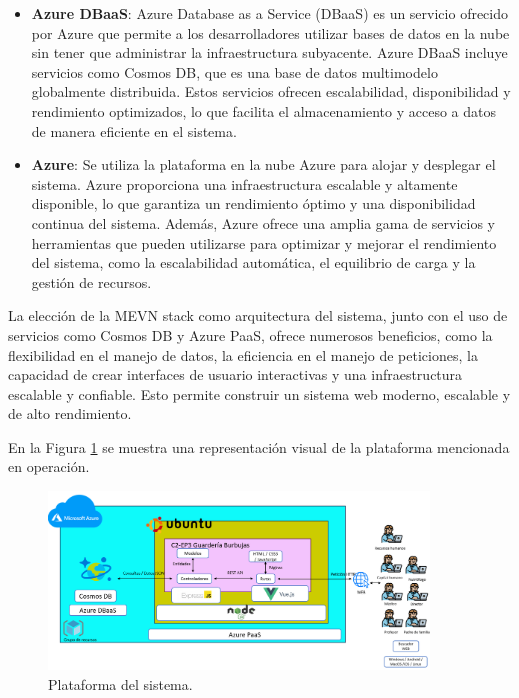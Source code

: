 \begin{itemize}
\item \textbf{Azure DBaaS}: Azure Database as a Service (DBaaS) es un servicio ofrecido por Azure que permite a los desarrolladores utilizar bases de datos en la nube sin tener que administrar la infraestructura subyacente. Azure DBaaS incluye servicios como Cosmos DB, que es una base de datos multimodelo globalmente distribuida. Estos servicios ofrecen escalabilidad, disponibilidad y rendimiento optimizados, lo que facilita el almacenamiento y acceso a datos de manera eficiente en el sistema.

\item \textbf{Azure}: Se utiliza la plataforma en la nube Azure para alojar y desplegar el sistema. Azure proporciona una infraestructura escalable y altamente disponible, lo que garantiza un rendimiento óptimo y una disponibilidad continua del sistema. Además, Azure ofrece una amplia gama de servicios y herramientas que pueden utilizarse para optimizar y mejorar el rendimiento del sistema, como la escalabilidad automática, el equilibrio de carga y la gestión de recursos.
\end{itemize}

La elección de la MEVN stack como arquitectura del sistema, junto con el uso de servicios como Cosmos DB y Azure PaaS, ofrece numerosos beneficios, como la flexibilidad en el manejo de datos, la eficiencia en el manejo de peticiones, la capacidad de crear interfaces de usuario interactivas y una infraestructura escalable y confiable. Esto permite construir un sistema web moderno, escalable y de alto rendimiento.

En la Figura \ref{fig:plataforma} se muestra una representación visual de la plataforma mencionada en operación.

\begin{figure}[htbp]
\centering
\includegraphics[width=0.9\textwidth]{images/arqui/plataforma.png}
\caption{Plataforma del sistema.}
\label{fig:plataforma}
\end{figure}

